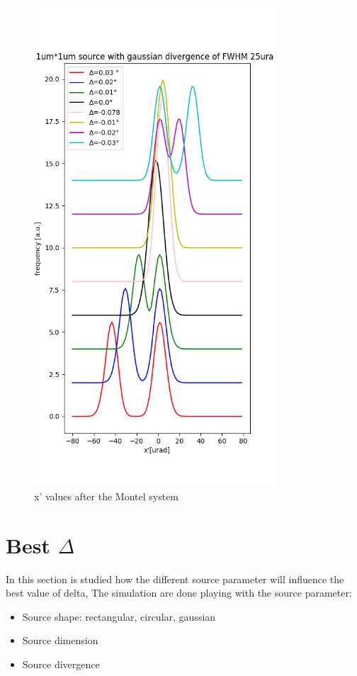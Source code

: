 \documentclass[a4paper]{article}
\begin{document}
\begin{figure}[H]
\centering
\includegraphics[width=0.8\textwidth]{histogram2.png}
\caption{\label{fig:histogram_2} x' values after the Montel system}
\end{figure}


\section{Best $\Delta$}

In this section is studied how the different source parameter will influence the best value of delta, The simulation are done playing with the source parameter:
\begin{itemize}
\item Source shape: rectangular, circular, gaussian
\item Source dimension
\item Source divergence
\end{itemize}
\end{document}
